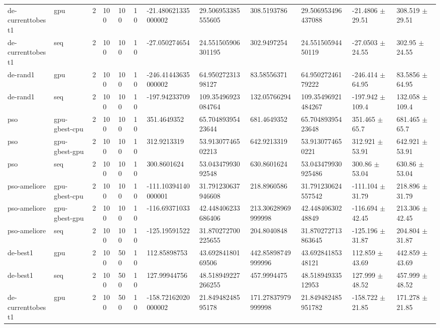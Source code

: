 \begin{table}[t]
\begin{tabular}{llllllllllll}
de-currenttobest1 & gpu & 2 & 100 & 100 & 10 & -21.480621335000002 & 29.506953385555605 & 308.5193786 & 29.506953496437088 & -21.4806 $\pm$ 29.51 & 308.519 $\pm$ 29.51 \\
de-currenttobest1 & seq & 2 & 100 & 100 & 10 & -27.050274654 & 24.551505906301195 & 302.9497254 & 24.55150594450119 & -27.0503 $\pm$ 24.55 & 302.95 $\pm$ 24.55 \\
de-rand1 & gpu & 2 & 100 & 100 & 10 & -246.41443635000002 & 64.95027231398127 & 83.58556371 & 64.95027246179222 & -246.414 $\pm$ 64.95 & 83.5856 $\pm$ 64.95 \\
de-rand1 & seq & 2 & 100 & 100 & 10 & -197.94233709 & 109.35496923084764 & 132.05766294 & 109.35496921484267 & -197.942 $\pm$ 109.4 & 132.058 $\pm$ 109.4 \\
pso & gpu-gbest-cpu & 2 & 100 & 100 & 10 & 351.4649352 & 65.70489395423644 & 681.4649352 & 65.70489395423648 & 351.465 $\pm$ 65.7 & 681.465 $\pm$ 65.7 \\
pso & gpu-gbest-gpu & 2 & 100 & 100 & 10 & 312.9213319 & 53.91307746502213 & 642.9213319 & 53.9130774650221 & 312.921 $\pm$ 53.91 & 642.921 $\pm$ 53.91 \\
pso & seq & 2 & 100 & 100 & 10 & 300.8601624 & 53.04347993092548 & 630.8601624 & 53.043479930925486 & 300.86 $\pm$ 53.04 & 630.86 $\pm$ 53.04 \\
pso-ameliore & gpu-gbest-cpu & 2 & 100 & 100 & 10 & -111.10394140000001 & 31.791230637946608 & 218.8960586 & 31.791230624557542 & -111.104 $\pm$ 31.79 & 218.896 $\pm$ 31.79 \\
pso-ameliore & gpu-gbest-gpu & 2 & 100 & 100 & 10 & -116.69371033 & 42.448406233686406 & 213.30628969999998 & 42.44840630248849 & -116.694 $\pm$ 42.45 & 213.306 $\pm$ 42.45 \\
pso-ameliore & seq & 2 & 100 & 100 & 10 & -125.19591522 & 31.870272700225655 & 204.8040848 & 31.870272713863645 & -125.196 $\pm$ 31.87 & 204.804 $\pm$ 31.87 \\
de-best1 & gpu & 2 & 100 & 500 & 10 & 112.85898753 & 43.69284180169506 & 442.85898749999996 & 43.69284185348121 & 112.859 $\pm$ 43.69 & 442.859 $\pm$ 43.69 \\
de-best1 & seq & 2 & 100 & 500 & 10 & 127.99944756 & 48.518949227266255 & 457.9994475 & 48.51894933512953 & 127.999 $\pm$ 48.52 & 457.999 $\pm$ 48.52 \\
de-currenttobest1 & gpu & 2 & 100 & 500 & 10 & -158.72162020000002 & 21.84948248595178 & 171.27837979999998 & 21.849482485951782 & -158.722 $\pm$ 21.85 & 171.278 $\pm$ 21.85 \\

\end{tabular}
\end{table}
